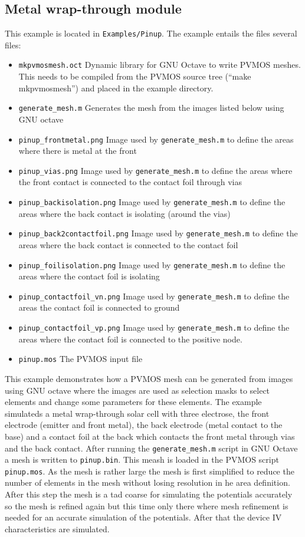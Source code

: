 \documentclass[noshowpacs,preprintnumbers,amsmath,amssymb, letter]{revtex4}
\begin{document}
\subsection{Metal wrap-through module}
This example is located in \texttt{Examples/Pinup}. The example entails the files several files:
\begin{itemize}
\item{\texttt{mkpvmosmesh.oct}} Dynamic library for GNU Octave to write PVMOS meshes. This needs to be compiled from the PVMOS source tree (``make mkpvmosmesh'') and placed in the example directory.
\item{\texttt{generate\_mesh.m}} Generates the mesh from the images listed below using GNU octave 
\item{\texttt{pinup\_frontmetal.png}} Image used by \texttt{generate\_mesh.m} to define the areas where there is metal at the front
\item{\texttt{pinup\_vias.png}} Image used by \texttt{generate\_mesh.m} to define the areas where the front contact is connected to the contact foil through vias
\item{\texttt{pinup\_backisolation.png}} Image used by \texttt{generate\_mesh.m} to define the areas where the back contact is isolating (around the vias)
\item{\texttt{pinup\_back2contactfoil.png}} Image used by \texttt{generate\_mesh.m} to define the areas where the back contact is connected to the contact foil
\item{\texttt{pinup\_foilisolation.png}} Image used by \texttt{generate\_mesh.m} to define the areas where the contact foil is isolating
\item{\texttt{pinup\_contactfoil\_vn.png}} Image used by \texttt{generate\_mesh.m} to define the areas the contact foil is connected to ground
\item{\texttt{pinup\_contactfoil\_vp.png}} Image used by \texttt{generate\_mesh.m} to define the areas where the contact foil is connected to the positive node.
\item{\texttt{pinup.mos}} The PVMOS input file
\end{itemize}
This example demonstrates how a PVMOS mesh can be generated from images using GNU octave where the images are used as selection masks to select elements and change some parameters for these elements. The example simulateds a metal wrap-through solar cell with three electrose, the front electrode (emitter and front metal), the back electrode (metal contact to the base) and a contact foil at the back which contacts the front metal through vias and the back contact. After running the \texttt{generate\_mesh.m} script in GNU Octave a mesh is written to  \texttt{pinup.bin}. This meash is loaded in the PVMOS script \texttt{pinup.mos}. As the mesh is rather large the mesh is first simplified to reduce the number of elements in the mesh without losing resolution in he area definition. After this step the mesh is a tad coarse for simulating the potentials accurately so the mesh is refined again but this time only there where mesh refinement is needed for an accurate simulation of the potentials. After that the device IV characteristics are simulated.
\end{document}
